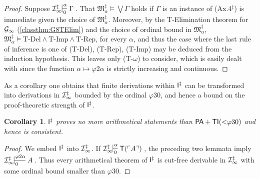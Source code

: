 \documentclass[UKenglish,cleveref,DIV=12]{scrartcl}
\newtheorem{corollary}[lemma]{Corollary}
\theoremstyle{definition}
\theoremstyle{definition}
\begin{document}
\begin{proof} Suppose $\Iinfty^\ddag\prov\alpha0\Gamma$. That $\mathfrak{M}^\ddag_\alpha\models\bigvee\Gamma$ holds if $\Gamma$ is an instance of (Ax.4$^\ddag$) is immediate given the choice of $\mathfrak{M}^\ddag_\alpha$. Moreover, by
the T-Elimination theorem for $\mathcal{G}_\infty$ (\cref{classthm:G8TElim}) and the choice of ordinal bound in $\mathfrak{M}^\ddag_\alpha$, $\mathfrak{M}^\ddag_\alpha\models\text{T-Del}\land\text{T-Imp}\land\text{T-Rep}$,
for every $\alpha$, and thus the case where the last rule of inference is one of
(T-Del), (T-Rep), (T-Imp) may be deduced from the induction hypothesis. This
leaves only (T-$\omega$) to consider, which is easily dealt with since the
function $\alpha\mapsto\varphi2\alpha$ is strictly increasing and continuous.
\end{proof}

As a corollary one obtains that finite derivations within $\mathsf{I}^\ddag$ can be
transformed into derivations in $\mathcal{I}_\infty^\ddag$ bounded by the ordinal $\varphi30$, and hence a
bound on the proof-theoretic strength of $\mathsf{I}^\ddag$.
\begin{corollary}\label{extcor:Istrength}
$\mathsf{I}^\ddag$ proves no more arithmetical statements than $\mathsf{PA}+\mathsf{TI}(\mathord<\varphi30)$
and hence is consistent.
\end{corollary}
\begin{proof}
We embed $\mathsf{I}^\ddag$ into $\mathcal{I}_\infty^\ddag$. If $\Iinfty^\ddag\prov\alpha0{\T(\gn A)}$,
the preceding two lemmata imply $\Iinfty^\ddag\prov{\varphi2\alpha}0A$. Thus
every arithmetical theorem of $\mathsf{I}^\ddag$ is cut-free derivable in $\mathcal{I}_\infty^\ddag$
with some ordinal bound smaller than $\varphi30$.
\end{proof}
\end{document}
